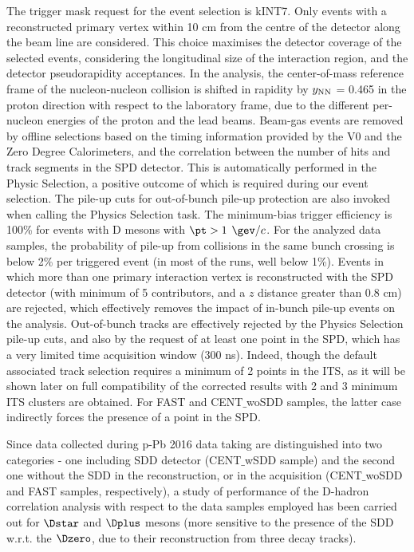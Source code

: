 The trigger mask request for the event selection is kINT7. Only events with a reconstructed primary vertex within 10 cm from the centre of the detector along the beam line are considered. This choice maximises the detector coverage of the selected events, considering the longitudinal size of the interaction region, and
the detector pseudorapidity acceptances. In the analysis, the center-of-mass reference frame of the nucleon-nucleon collision is shifted in rapidity by $y_{\rm NN}$ = 0.465 in the proton direction with respect to the laboratory frame, due to the different per-nucleon energies of the proton and the lead beams.
Beam-gas events are removed by offline selections based on the timing information provided by the V0 and the Zero Degree Calorimeters, and the correlation between the number of hits and track segments in the SPD detector. This is automatically performed in the Physic Selection, a positive outcome of which is required during our event selection. The pile-up cuts for out-of-bunch pile-up protection are also invoked when calling the Physics Selection task.
The minimum-bias trigger efficiency is 100\% for events with D mesons with $\pt > 1$ $\gev/c$. For the analyzed data samples, the probability of pile-up from collisions in the same bunch crossing is below 2\% per triggered event (in most of the runs, well below 1\%). Events in which more than one primary interaction vertex is reconstructed with the SPD detector (with minimum of 5 contributors, and a $z$ distance greater than 0.8 cm) are rejected, which effectively removes the impact of in-bunch pile-up events on the analysis. Out-of-bunch tracks are effectively rejected by the Physics Selection pile-up cuts, and also by the request of at least one point in the SPD, which has a very limited time acquisition window (300 ns). Indeed, though the default associated track selection requires a minimum of 2 points in the ITS, as it will be shown later on full compatibility of the corrected results with 2 and 3 minimum ITS clusters are obtained. For FAST and CENT$\_$woSDD samples, the latter case indirectly forces the presence of a point in the SPD.

Since data collected during p-Pb 2016 data taking are distinguished into two categories - one including SDD detector (CENT$\_$wSDD sample) and the second one without the SDD in the reconstruction, or in the acquisition (CENT$\_$woSDD and FAST samples, respectively), a study of performance of the D-hadron correlation analysis with respect to the data samples employed has been carried out for $\Dstar$ and $\Dplus$ mesons (more sensitive to the presence of the SDD w.r.t. the $\Dzero$, due to their reconstruction from three decay tracks).

